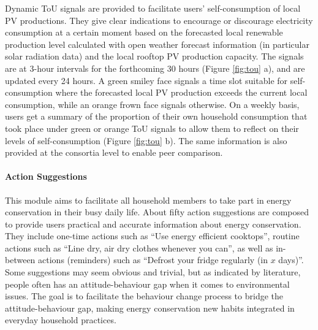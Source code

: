 
Dynamic ToU signals are provided to facilitate users' self-consumption of local PV productions.
They give clear indications to encourage or discourage electricity consumption at a certain moment based on the forecasted local renewable production level calculated with open weather forecast information (in particular solar radiation data) and the local rooftop PV production capacity. 
The signals are at 3-hour intervals for the forthcoming 30 hours (Figure \ref{fig:tou} a), and are updated every 24 hours. A green smiley face signals a time slot suitable for self-consumption where the forecasted local PV production exceeds the current local consumption, while an orange frown face signals otherwise.  
% 
On a weekly basis, users get a summary of the proportion of their own household consumption that took place under green or orange ToU signals to allow them to reflect on their levels of self-consumption (Figure \ref{fig:tou} b). The same information is also provided at the consortia level to enable peer comparison. 

\paragraph{Action Suggestions}

This module aims to %
facilitate all household members to take part in energy conservation in their busy daily life. 
% 
About fifty action suggestions are composed to provide users practical and accurate information about energy conservation. 
They include one-time actions such as ``Use energy efficient cooktops'', routine actions such as ``Line dry, air dry clothes whenever you can'', as well as in-between actions (reminders) such as ``Defrost your fridge regularly (in $x$ days)''. 
Some suggestions may seem obvious and trivial, but as indicated by literature, people often has an attitude-behaviour gap when it comes to environmental issues. The goal is to facilitate the behaviour change process to bridge the attitude-behaviour gap, making energy conservation new habits integrated in everyday household practices. 


